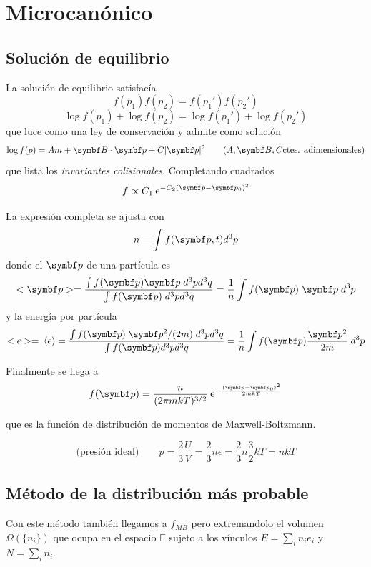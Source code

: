 \documentclass[10pt,oneside]{CBFT_book}
\begin{document}
\section{Microcanónico}

\subsection{Solución de equilibrio}

La solución de equilibrio satisfacía
\[
	f(p_1) f(p_2) = f(p_1') f(p_2')
\]
\[
	\log f(p_1) + \log f(p_2) = \log f(p_1') + \log f(p_2')
\]
que luce como una ley de conservación y admite como solución
\[
	\log f(p) = A m + \vb{B}\cdot \vb{p} + C|\vb{p}|^2 
	\qquad (A,\vb{B},C \text{ctes. adimensionales})
\]
que lista los {\it invariantes colisionales}. Completando cuadrados
\[
	f \propto C_1 \euler^{-C_2(\vb{p} - \vb{p}_0)^2}
\]

La expresión completa se ajusta con 
\[
	n = \int f(\vb{p},t) d^3p
\]
donde el $\vb{p}$ de una partícula es
\[
	<\vb{p}> = \frac{\int f(\vb{p}) \vb{p} \; d^3p d^3q}{\int f(\vb{p}) \; d^3p d^3q } = 
	\frac{1}{n} \int f(\vb{p}) \; \vb{p} \; d^3p
\]
y la energía por partícula
\[
	<e> = \vm{e} = \frac{\int f(\vb{p}) \; \vb{p}^2/ (2m) \; d^3p d^3q}{\int f(\vb{p}) d^3p d^3q } = 
	\frac{1}{n} \int f(\vb{p}) \frac{ \vb{p}^2 }{ 2m } \; d^3p
\]

Finalmente se llega a 
\[
	f(\vb{p}) = \frac{n}{(2\pi m k T)^{3/2}} \euler^{- \frac{( \vb{p} - \vb{p}_0 )^2}{2mkT} }
\]

que es la función de distribución de momentos de Maxwell-Boltzmann.

\[
	\text{(presión ideal)} \qquad p = \frac{2}{3} \frac{U}{V} = \frac{2}{3} n \epsilon =
	\frac{2}{3} n \frac{3}{2} k T = nkT 
\]

\subsection{Método de la distribución más probable}

Con este método también llegamos a $f_{MB}$ pero extremandolo el volumen $\Omega(\{ n_i \})$ que ocupa en el espacio
$\mathbb{\Gamma}$ sujeto a los vínculos $E = \sum_i n_i e_i$ y $N = \sum_i n_i $.
\end{document}
